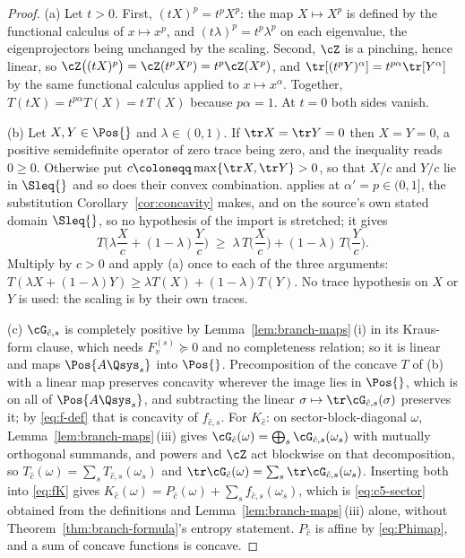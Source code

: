 \begin{proof}
(a) Let $t>0$. First, $(tX)^{p}=t^{p}X^{p}$: the map $X\mapsto X^{p}$ is
defined by the functional calculus of $x\mapsto x^{p}$, and
$(t\lambda)^{p}=t^{p}\lambda^{p}$ on each eigenvalue, the eigenprojectors
being unchanged by the scaling. Second, $\cZ$ is a pinching, hence
linear, so $\cZ\big((tX)^{p}\big)=\cZ(t^{p}X^{p})=t^{p}\cZ(X^{p})$, and
$\tr[(t^{p}Y)^{\alpha}]=t^{p\alpha}\tr[Y^{\alpha}]$ by the same functional
calculus applied to $x\mapsto x^{\alpha}$. Together,
$T(tX)=t^{p\alpha}T(X)=t\,T(X)$ because $p\alpha=1$. At $t=0$ both sides
vanish.

(b) Let $X,Y\in\Pos{}$ and $\lambda\in(0,1)$. If $\tr X=\tr Y=0$ then
$X=Y=0$, a positive semidefinite operator of zero trace being zero, and
the inequality reads $0\ge0$. Otherwise put
$c\coloneqq\max\{\tr X,\tr Y\}>0$, so that $X/c$ and $Y/c$ lie in
$\Sleq{}$ and so does their convex combination. 
applies at $\alpha'=p\in(0,1]$, the substitution
Corollary~\ref{cor:concavity} makes, and on the source's own stated
domain $\Sleq{}$, so no hypothesis of the import is stretched; it gives
\begin{equation*}
  T\Big(\lambda\frac{X}{c}+(1-\lambda)\frac{Y}{c}\Big)
  \;\ge\;\lambda\,T\Big(\frac{X}{c}\Big)
  +(1-\lambda)\,T\Big(\frac{Y}{c}\Big).
\end{equation*}
Multiply by $c>0$ and apply (a) once to each of the three arguments:
$T(\lambda X+(1-\lambda)Y)\ge\lambda T(X)+(1-\lambda)T(Y)$. No trace
hypothesis on $X$ or $Y$ is used: the scaling is by their own traces.

(c) $\cG_{\hat c,s}$ is completely positive by Lemma~\ref{lem:branch-maps}\,(i) in
its Kraus-form clause, which needs $F^{(s)}_v\succeq0$ and no completeness
relation; so it is linear and maps $\Pos{A\Qsys_s}$ into $\Pos{}$.
Precomposition of the concave $T$ of (b) with a linear map preserves
concavity wherever the image lies in $\Pos{}$, which is on all of
$\Pos{A\Qsys_s}$, and subtracting the linear
$\sigma\mapsto\tr\cG_{\hat c,s}(\sigma)$ preserves it; by
\eqref{eq:f-def} that is concavity of $f_{\hat c,s}$. For $K_{\hat c}$:
on sector-block-diagonal $\omega$, Lemma~\ref{lem:branch-maps}\,(iii) gives
$\cG_{\hat c}(\omega)=\bigoplus_s\cG_{\hat c,s}(\omega_s)$ with mutually
orthogonal summands, and powers and $\cZ$ act blockwise on that
decomposition, so $T_{\hat c}(\omega)=\sum_sT_{\hat c,s}(\omega_s)$ and
$\tr\cG_{\hat c}(\omega)=\sum_s\tr\cG_{\hat c,s}(\omega_s)$. Inserting
both into \eqref{eq:fK} gives
$K_{\hat c}(\omega)=P_{\hat c}(\omega)+\sum_sf_{\hat c,s}(\omega_s)$,
which is \eqref{eq:c5-sector} obtained from the definitions and
Lemma~\ref{lem:branch-maps}\,(iii) alone, without Theorem~\ref{thm:branch-formula}'s entropy
statement. $P_{\hat c}$ is affine by \eqref{eq:Phimap}, and a sum of
concave functions is concave.
\end{proof}
